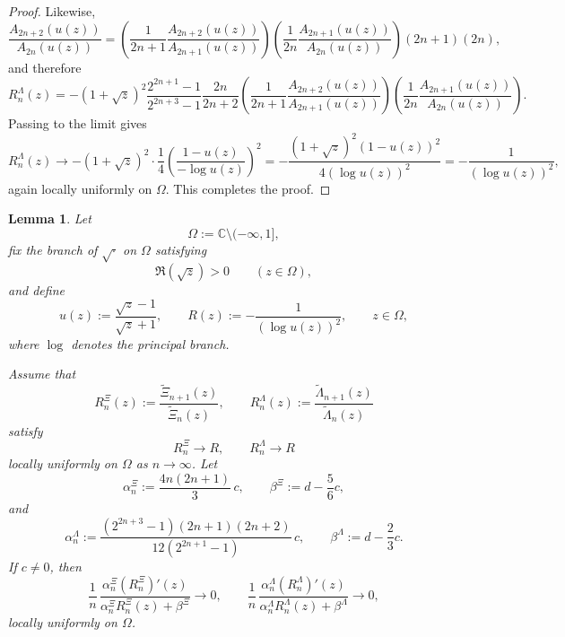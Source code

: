 \documentclass[11pt,twoside]{article}
\newtheorem{lemma}[theorem]{Lemma}
\numberwithin{equation}{section}
\begin{document}
\begin{proof}
Likewise,
\[
\frac{A_{2n+2}(u(z))}{A_{2n}(u(z))}
=
\left(\frac1{2n+1}\frac{A_{2n+2}(u(z))}{A_{2n+1}(u(z))}\right)
\left(\frac1{2n}\frac{A_{2n+1}(u(z))}{A_{2n}(u(z))}\right)
(2n+1)(2n),
\]
and therefore
\[
R_n^\Lambda(z)
=
-(1+\sqrt z)^2
\frac{2^{2n+1}-1}{2^{2n+3}-1}
\frac{2n}{2n+2}
\left(\frac1{2n+1}\frac{A_{2n+2}(u(z))}{A_{2n+1}(u(z))}\right)
\left(\frac1{2n}\frac{A_{2n+1}(u(z))}{A_{2n}(u(z))}\right).
\]
Passing to the limit gives
\[
R_n^\Lambda(z)
\longrightarrow
-(1+\sqrt z)^2\cdot\frac14
\left(\frac{1-u(z)}{-\log u(z)}\right)^2
=
-\frac{(1+\sqrt z)^2(1-u(z))^2}{4(\log u(z))^2}
=
-\frac{1}{(\log u(z))^2},
\]
again locally uniformly on \(\Omega\). This completes the proof.
\end{proof}

\begin{lemma}\label{lem:correction-term-vanishes}
Let
\[
\Omega:=\mathbb C\setminus(-\infty,1],
\]
fix the branch of \(\sqrt{\cdot}\) on \(\Omega\) satisfying
\[
\Re(\sqrt z)>0 \qquad (z\in\Omega),
\]
and define
\[
u(z):=\frac{\sqrt z-1}{\sqrt z+1},
\qquad
R(z):=-\frac{1}{(\log u(z))^2},
\qquad z\in\Omega,
\]
where \(\log\) denotes the principal branch.

Assume that
\[
R_n^\Xi(z):=\frac{\widetilde{\Xi}_{n+1}(z)}{\widetilde{\Xi}_n(z)},
\qquad
R_n^\Lambda(z):=\frac{\widetilde{\Lambda}_{n+1}(z)}{\widetilde{\Lambda}_n(z)}
\]
satisfy
\[
R_n^\Xi \longrightarrow R,
\qquad
R_n^\Lambda \longrightarrow R
\]
locally uniformly on \(\Omega\) as \(n\to\infty\). Let
\[
\alpha_n^\Xi:=\frac{4n(2n+1)}{3}\,c,
\qquad
\beta^\Xi:=d-\frac56c,
\]
and
\[
\alpha_n^\Lambda:=
\frac{(2^{2n+3}-1)(2n+1)(2n+2)}{12(2^{2n+1}-1)}\,c,
\qquad
\beta^\Lambda:=d-\frac23c.
\]
If \(c\neq 0\), then
\[
\frac1n\,
\frac{\alpha_n^\Xi (R_n^\Xi)'(z)}
{\alpha_n^\Xi R_n^\Xi(z)+\beta^\Xi}
\longrightarrow 0,
\qquad
\frac1n\,
\frac{\alpha_n^\Lambda (R_n^\Lambda)'(z)}
{\alpha_n^\Lambda R_n^\Lambda(z)+\beta^\Lambda}
\longrightarrow 0,
\]
locally uniformly on \(\Omega\).
\end{lemma}
\end{document}
